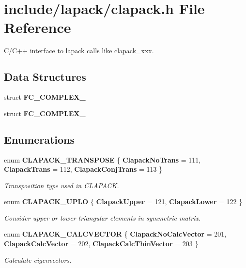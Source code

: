 \section{include/lapack/clapack.h File Reference}
\label{d6/d79/clapack_8h}


C/\-C++ interface to lapack calls like clapack\-\_\-xxx.  


\subsection*{Data Structures}
\begin{DoxyCompactItemize}
\item 
struct {\bf F\-C\-\_\-\-C\-O\-M\-P\-L\-E\-X\-\_}
\item 
struct {\bf F\-C\-\_\-\-C\-O\-M\-P\-L\-E\-X\-\_}
\end{DoxyCompactItemize}
\subsection*{Enumerations}
\begin{DoxyCompactItemize}
\item 
enum {\bf C\-L\-A\-P\-A\-C\-K\-\_\-\-T\-R\-A\-N\-S\-P\-O\-S\-E} \{ {\bf Clapack\-No\-Trans} = 111, 
{\bf Clapack\-Trans} = 112, 
{\bf Clapack\-Conj\-Trans} = 113
 \}
\begin{DoxyCompactList}\small\item\em Transposition type used in C\-L\-A\-P\-A\-C\-K. \end{DoxyCompactList}\item 
enum {\bf C\-L\-A\-P\-A\-C\-K\-\_\-\-U\-P\-L\-O} \{ {\bf Clapack\-Upper} = 121, 
{\bf Clapack\-Lower} = 122
 \}
\begin{DoxyCompactList}\small\item\em Consider upper or lower triangular elements in symmetric matrix. \end{DoxyCompactList}\item 
enum {\bf C\-L\-A\-P\-A\-C\-K\-\_\-\-C\-A\-L\-C\-V\-E\-C\-T\-O\-R} \{ {\bf Clapack\-No\-Calc\-Vector} = 201, 
{\bf Clapack\-Calc\-Vector} = 202, 
{\bf Clapack\-Calc\-Thin\-Vector} = 203
 \}
\begin{DoxyCompactList}\small\item\em Calculate eigenvectors. \end{DoxyCompactList}\end{DoxyCompactItemize}
